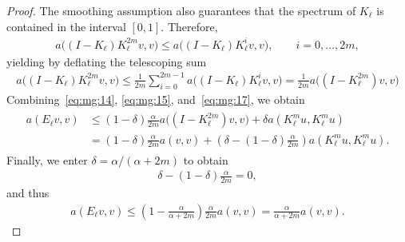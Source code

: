 \begin{proof}
  The smoothing assumption also guarantees that the spectrum of
  $K_\ell$ is contained in the interval $[0,1]$. Therefore,
  \begin{gather}
    \label{eq:mg:16}
    a\bigl((I-K_\ell) K_\ell^{2m} v,v\bigr)
    \le a\bigl((I-K_\ell) K_\ell^{i} v,v\bigr),
    \qquad i=0,\dots,2m,
  \end{gather}
  yielding by deflating the telescoping sum
  \begin{gather}
    \label{eq:mg:17}
    a\bigl((I-K_\ell) K_\ell^{2m} v,v\bigr)
    \le \frac1{2m} \sum_{i=0}^{2m-1}
    a\bigl((I-K_\ell) K_\ell^{i} v,v\bigr)
    = \frac1{2m} a\bigl((I-K_\ell^{2m}) v,v\bigr)
  \end{gather}
  Combining~\eqref{eq:mg:14}, \eqref{eq:mg:15}, and~\eqref{eq:mg:17},
  we obtain
  \begin{gather}
    \begin{split}
      a(E_\ell v,v) &\le (1-\delta)\frac\alpha{2m}
      a\bigl((I-K_\ell^{2m}) v,v\bigr)
      + \delta a(K_\ell^m u,K_\ell^m u)
      \\
      &= (1-\delta)\frac\alpha{2m} a(v,v)
      + \left(\delta - (1-\delta)\frac\alpha{2m}\right)
      a(K_\ell^m u,K_\ell^m u).
    \end{split}
  \end{gather}
  Finally, we enter $\delta=\alpha/(\alpha+2m)$ to obtain
  \begin{gather*}
    \delta - (1-\delta)\frac\alpha{2m} = 0,
  \end{gather*}
  and thus
  \begin{gather}
    \label{eq:mg:18}
    a(E_\ell v,v) \le \left(1-\frac\alpha{\alpha+2m}\right)\frac\alpha{2m}
    a(v,v) = \frac\alpha{\alpha+2m}a(v,v). 
  \end{gather}
\end{proof}



